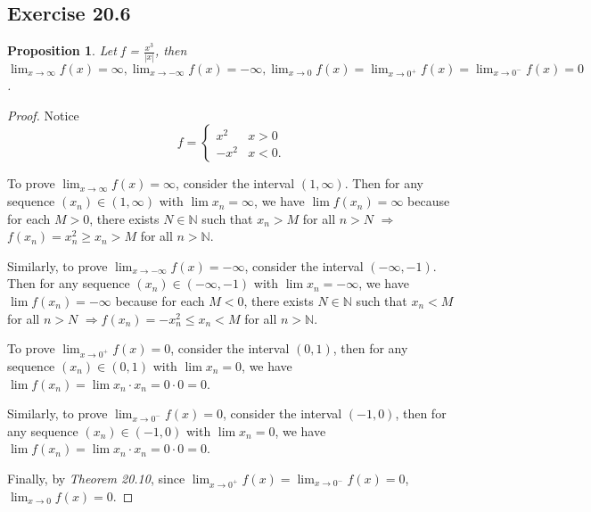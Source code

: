 \documentclass{article}
\newtheorem{proposition}[thm]{Proposition}
\renewcommand*{\implies}{\ensuremath{\Longrightarrow}}
\newcommand*{\N}{\ensuremath{\mathbb{N}}}
\begin{document}
\subsection*{Exercise 20.6}
\begin{proposition}
    Let f = $\frac{x^3}{|x|}$, then $\lim_{x\to\infty}f(x)=\infty, \lim_{x\to-\infty}f(x)=-\infty, 
    \lim_{x\to0}f(x)=\lim_{x\to0^+}f(x)=\lim_{x\to0^-}f(x)=0$.
\end{proposition}
\begin{proof}
    Notice $$f=\begin{cases}
        x^2 & x>0 \\
        -x^2 & x<0.
    \end{cases}$$

    To prove $\lim_{x\to\infty}f(x)=\infty$, consider the interval $(1,\infty)$. Then for any 
    sequence $(x_n)\in (1,\infty)$ with $\lim x_n=\infty$, we have $\lim f(x_n)=\infty$ because
    for each $M>0$, there exists $N\in\N$ such that $x_n>M$ for all $n>N$ \implies 
    $f(x_n)=x_n^2\ge x_n > M$ for all $n>\N$.

    Similarly, to prove $\lim_{x\to-\infty}f(x)=-\infty$, consider the interval $(-\infty,-1)$. 
    Then for any sequence $(x_n)\in (-\infty,-1)$ with $\lim x_n=-\infty$, we have
    $\lim f(x_n)=-\infty$ because for each $M<0$, there exists $N\in\N$ such that
    $x_n<M$ for all $n>N$ \implies $f(x_n)=-x_n^2\le x_n < M$ for all $n>\N$.

    To prove $\lim_{x\to0^+}f(x)=0$, consider the interval $(0,1)$, then for any sequence 
    $(x_n)\in (0,1)$ with $\lim x_n=0$, we have $\lim f(x_n)=\lim x_n\cdot x_n=0\cdot 0=0$.

    Similarly, to prove $\lim_{x\to0^-}f(x)=0$, consider the interval $(-1,0)$, then for any
    sequence $(x_n)\in (-1,0)$ with $\lim x_n=0$, we have $\lim f(x_n)=\lim x_n\cdot x_n=0\cdot 0=0$.

    Finally, by \emph{Theorem 20.10}, since $\lim_{x\to0^+}f(x)=\lim_{x\to0^-}f(x)=0$, 
    $\lim_{x\to0}f(x)=0$.
\end{proof}
\end{document}
